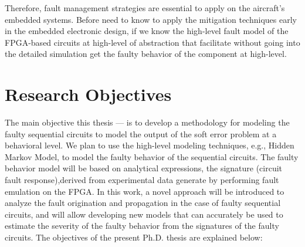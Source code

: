 %

Therefore, fault management strategies are essential to apply on the aircraft's embedded systems. Before need to know to apply the mitigation techniques early in the embedded electronic design, if we know the high-level fault model of the FPGA-based circuits at high-level of abstraction that facilitate without going into the detailed simulation get the faulty behavior of the component at high-level.

  









\section{Research Objectives}


The main objective this thesis --- is to develop a methodology for modeling the faulty sequential circuits to model the output of the soft error problem at a behavioral level. We plan to use the high-level modeling techniques, e.g., Hidden Markov Model, to model the faulty behavior of the sequential circuits. The faulty behavior model will be based on analytical expressions, the signature (circuit fault response),derived from  experimental data generate by performing fault emulation on the FPGA. In this work, a novel approach will be introduced to analyze the fault origination and propagation in the case of faulty sequential circuits, and will allow developing new models that can accurately be used to estimate the severity of the faulty behavior from the signatures of the faulty circuits. The objectives of the present Ph.D. thesis are explained below: 

